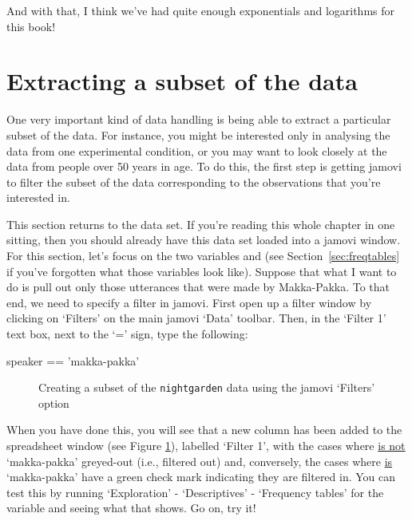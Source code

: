 And with that, I think we've had quite enough exponentials and logarithms for this book!



\section{Extracting a subset of the data~\label{sec:subset}}

One very important kind of data handling is being able to extract a particular subset of the data. For instance, you might be interested only in analysing the data from one experimental condition, or you may want to look closely at the data from people over 50 years in age. To do this, the first step is getting jamovi to filter the subset of the data corresponding to the observations that you're interested in. 

This section returns to the  data set. If you're reading this whole chapter in one sitting, then you should already have this data set loaded into a jamovi window. For this section, let's focus on the two variables  and  (see Section~\ref{sec:freqtables} if you've forgotten what those variables look like). Suppose that what I want to do is pull out only those utterances that were made by Makka-Pakka. To that end, we need to specify a filter in jamovi. First open up a filter window by clicking on `Filters' on the main jamovi `Data' toolbar. Then, in the `Filter 1' text box, next to the `=' sign, type the following:
\begin{rblock1}
speaker == 'makka-pakka'
\end{rblock1}

\begin{figure}[htb!!]
\begin{center}
\caption{Creating a subset of the \texttt{nightgarden} data using the jamovi `Filters' option}
\label{fig:subset1}
\HR
\end{center}
\end{figure}

When you have done this, you will see that a new column has been added to the spreadsheet window (see Figure \ref{fig:subset1}), labelled `Filter 1', with the cases where  \underline{is not} `makka-pakka' greyed-out (i.e., filtered out) and, conversely, the cases where  \underline{is} `makka-pakka' have a green check mark indicating they are filtered in. You can test this by running `Exploration' - `Descriptives' - `Frequency tables' for the  variable and seeing what that shows. Go on, try it!


